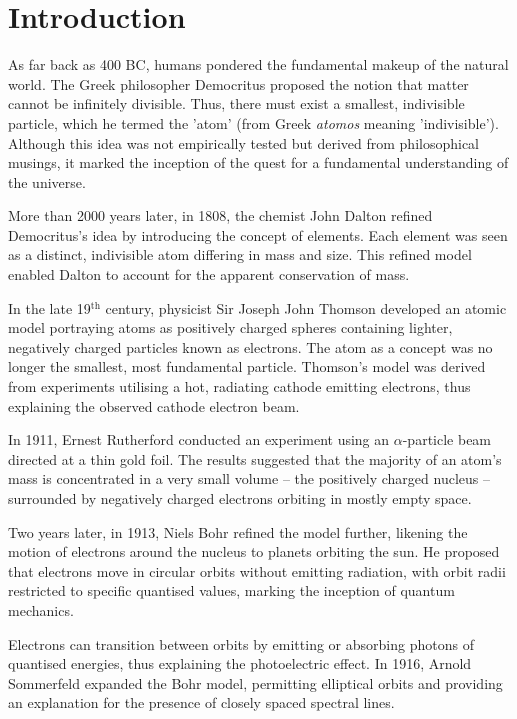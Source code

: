 \chapter{Introduction}
\label{ch:introduction}
As far back as 400 BC, humans pondered the fundamental makeup of the natural world. The Greek philosopher Democritus proposed the notion that matter cannot be infinitely divisible. Thus, there must exist a smallest, indivisible particle, which he termed the 'atom' (from Greek \textit{atomos} meaning 'indivisible'). Although this idea was not empirically tested but derived from philosophical musings, it marked the inception of the quest for a fundamental understanding of the universe.

More than 2000 years later, in 1808, the chemist John Dalton refined Democritus's idea by introducing the concept of elements. Each element was seen as a distinct, indivisible atom differing in mass and size. This refined model enabled Dalton to account for the apparent conservation of mass.

In the late 19$^\text{th}$ century, physicist Sir Joseph John Thomson developed an atomic model portraying atoms as positively charged spheres containing lighter, negatively charged particles known as electrons. The atom as a concept was no longer the smallest, most fundamental particle. Thomson's model was derived from experiments utilising a hot, radiating cathode emitting electrons, thus explaining the observed cathode electron beam.

In 1911, Ernest Rutherford conducted an experiment using an $\alpha$-particle beam directed at a thin gold foil. The results suggested that the majority of an atom's mass is concentrated in a very small volume – the positively charged nucleus – surrounded by negatively charged electrons orbiting in mostly empty space.

Two years later, in 1913, Niels Bohr refined the model further, likening the motion of electrons around the nucleus to planets orbiting the sun. He proposed that electrons move in circular orbits without emitting radiation, with orbit radii restricted to specific quantised values, marking the inception of quantum mechanics.

Electrons can transition between orbits by emitting or absorbing photons of quantised energies, thus explaining the photoelectric effect. In 1916, Arnold Sommerfeld expanded the Bohr model, permitting elliptical orbits and providing an explanation for the presence of closely spaced spectral lines.

